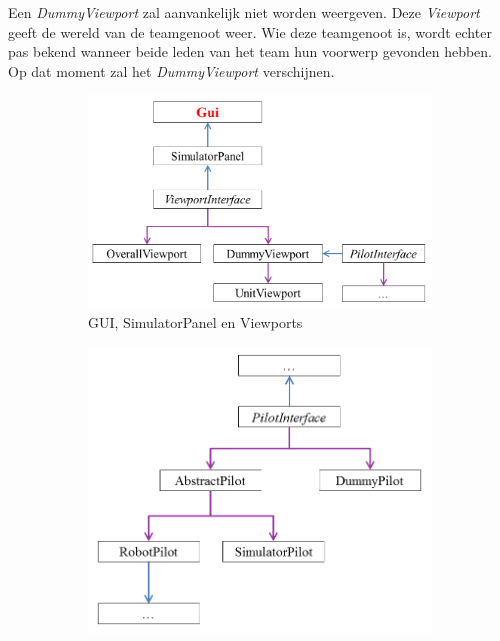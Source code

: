 \documentclass[tt1]{penoverslag}
\begin{document}
Een \textit{DummyViewport} zal aanvankelijk niet worden weergeven. Deze \textit{Viewport} geeft de wereld van de teamgenoot weer. Wie deze teamgenoot is, wordt echter pas bekend wanneer beide leden van het team hun voorwerp gevonden hebben. Op dat moment zal het \textit{DummyViewport} verschijnen.\\

\begin{landscape}
\begin{figure}
\centering
	\begin{subfigure}{0.60\textwidth}
	\centering
		\includegraphics[width=\textwidth]{KlasGUI}
		\caption{GUI, SimulatorPanel en Viewports}
	\end{subfigure}%
	\begin{subfigure}{0.5\textwidth}
		\centering
		\includegraphics[width=\textwidth]{KlasPilot}

\end{subfigure}
\end{figure}
\end{landscape}
\end{document}
